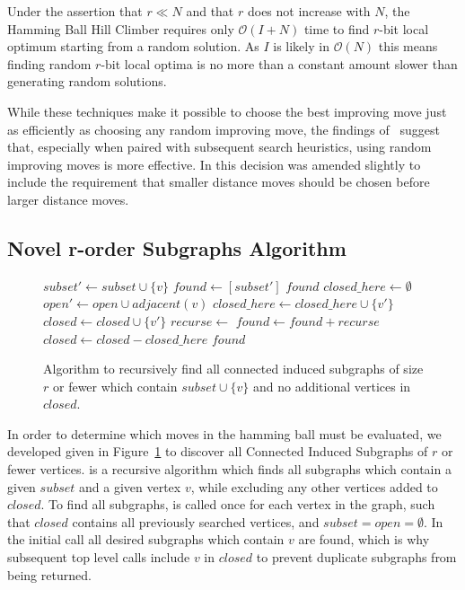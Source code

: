 \documentclass{sig-alternate}
\newcommand{\BigO}[1]{$\mathcal{O}{(#1)}$}
\begin{document}
Under the assertion that $r \ll N$ and that $r$ does not increase with $N$, the Hamming
Ball Hill Climber requires only \BigO{I+N} time to find $r$-bit local optimum starting
from a random solution. As $I$ is likely in \BigO{N} this means finding random $r$-bit local optima
is no more than a constant amount slower than generating random solutions.

While these techniques make it possible to choose the best improving move just as efficiently
as choosing any random improving move, the findings of~\cite{whitley:2013:greedy} suggest that,
especially when paired with subsequent search heuristics, using random improving moves is more effective.
In \cite{chicano:2014:ball} this decision was amended slightly to include the requirement that smaller
distance moves should be chosen before larger distance moves.

\subsection{Novel r-order Subgraphs Algorithm}
\begin{figure}
  \begin{algorithmic}[1]
    \State $subset' \leftarrow subset \cup \{v\}$
    \State $found \leftarrow [subset']$
      \Return $found$
    \EndIf
    \State $closed\_here \leftarrow \emptyset$
    \State $open' \leftarrow open \cup adjacent(v)$
        \State $closed\_here \leftarrow closed\_here \cup \{v'\}$
        \State $closed \leftarrow closed \cup \{v'\}$
        \State $recurse \leftarrow $
        \State $found \leftarrow found + recurse$
    \EndFor
    \State $closed \leftarrow closed - closed\_here$
    \State \Return $found$
  \EndProcedure
\end{algorithmic}
  \caption{Algorithm to recursively find all connected induced subgraphs of size $r$ or fewer which
           contain $subset \cup \{v\}$ and no additional vertices in $closed$.}
  \label{fig-connected-subgraphs}
\end{figure}

In order to determine which moves in the hamming ball must be evaluated,
we developed  given in Figure~\ref{fig-connected-subgraphs}
to discover all Connected Induced Subgraphs of $r$ or fewer vertices.
 is a recursive algorithm which finds all subgraphs
which contain a given $subset$ and a given vertex $v$, while excluding
any other vertices added to $closed$. To find all subgraphs, 
is called once for each vertex in the graph, such that $closed$ contains
all previously searched vertices, and $subset=open=\emptyset$. In the initial
call all desired subgraphs which contain $v$ are found, which is why subsequent
top level calls include $v$ in $closed$ to prevent duplicate subgraphs from being
returned.
\end{document}
